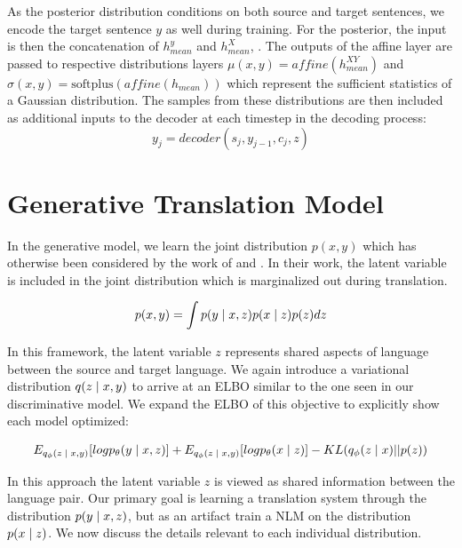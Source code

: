 As the  posterior distribution conditions on both source and target sentences, we encode the target sentence $y$ as well during training. For the posterior, the input is then the concatenation of $h_{mean}^y$ and $h_{mean}^X$, . The outputs of the affine layer are passed to respective distributions layers $\mu(x,y) = affine(h^{XY}_{mean})$ and $\sigma(x, y) = \text{softplus} (affine(h_{mean}))$ which represent the sufficient statistics of a Gaussian distribution. The samples from these distributions are then included as additional inputs to the decoder at each timestep in the decoding process:
\begin{equation}
y_{j} = decoder(s_{j}, y_{j-1}, c_{j}, z)
\end{equation}



\section{Generative Translation Model}

In the generative model, we learn the joint distribution $p(x, y)$ which has otherwise been considered by the work of \citet{eikema2018AEVNMT} and \citet{harshil2018GNMT}. In their work, the latent variable is included in the joint distribution which is marginalized out during translation.

\begin{equation}
	p(x, y) = \int p(y \; | \;{x, z})  p(x\; | \;{z}) p(z) dz
\end{equation}

In this framework, the latent variable $z$ represents shared aspects of language between the source and target language. We again introduce a variational distribution $q( z\; | \;{x, y})$ to arrive at an ELBO similar to the one seen in our discriminative model. We expand the \ac{ELBO} of this objective to explicitly show each model optimized:

\begin{equation}
E_{q_{\phi}(z \; | \;{x,y})} [ log p_{\theta}(y \; | \;{x, z})] +
E_{q_{\phi}(z \; | \;{x,y})} [ log p_{\theta}(x \; | \;{z})] -
	KL(q_{\phi}(z \; | \;{x}) || p(z))
\end{equation}

In this approach the latent variable $z$ is viewed as shared information between the language pair. Our primary goal is learning a translation system through the distribution $p(y \; | \;{x, z})$, but  as an artifact train a \ac{NLM} on the distribution $p(x \; | \;{z})$. We now discuss the details relevant to each individual distribution. 

